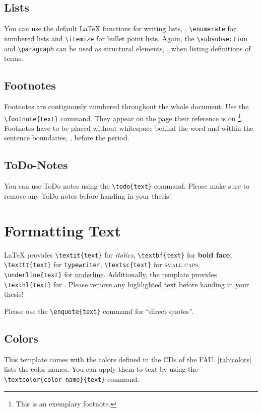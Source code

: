 \subsection{Lists}
You can use the default \LaTeX \- functions for writing lists, \viz, \texttt{\textbackslash enumerate} for numbered lists and \texttt{\textbackslash itemize} for bullet point lists. Again, the \texttt{\textbackslash subsubsection} and \texttt{\textbackslash paragraph} can be used as structural elements, \eg, when listing definitions of terms.

\subsection{Footnotes}
Footnotes are contiguously numbered throughout the whole document. Use the \texttt{\textbackslash footnote\{text\}} command.  They appear on the page their reference is on \footnote{This is an exemplary footnote.}. Footnotes have to be placed without whitespace behind the word and within the sentence boundaries, \ie, before the period.

\subsection{ToDo-Notes}
You can use ToDo notes using the \texttt{\textbackslash todo\{text\}}  command. Please make sure to remove any ToDo notes before handing in your thesis! 

\section{Formatting Text}
\LaTeX \- provides \texttt{\textbackslash textit\{text\}} for \textit{italics}, \texttt{\textbackslash textbf\{text\}} for \textbf{bold face}, \texttt{\textbackslash texttt\{text\}} for \texttt{typewriter}, \texttt{\textbackslash textsc\{text\}} for \textsc{small caps}, \texttt{\textbackslash underline\{text\}} for \underline{underline}. Additionally, the template provides  \texttt{\textbackslash texthl\{text\}} for . Please remove any highlighted text before handing in your thesis!

Please use the \texttt{\textbackslash enquote\{text\}} command for \enquote{direct quotes}.

\subsection{Colors}
This template comes with the colors defined in the \glspl{CD} of the \acrshort{FAU}. \Tab \ref{tab:colors} lists the color names. You can apply them to text by using the  \\ \texttt{\textbackslash textcolor\{color name\}\{text\}} command.
	
